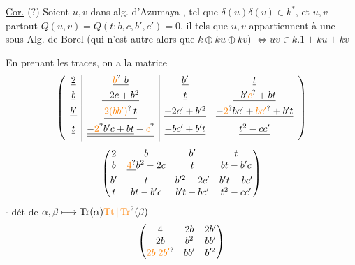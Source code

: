 \uline{Cor.} (?) Soient $u,v$ dans alg. d'Azumaya , tel que $\delta(u)\delta(v)\in k^*$,  et $u,v$ partout   $Q(u,v)=Q(t;b,c,b',c')=0$,  il  tels que $u,v$ appartiennent à une  sous-Alg. de Borel (qui n'est autre alors que $k\oplus ku\oplus kv$) $\Longleftrightarrow uv\in k.1+ku+kv$


En prenant les traces, on a la matrice
\[
\left(\begin{array}{c|c|cc}
\deleted{2}&\deleted{\unsure{b}\ b}&\deleted{b'}&\deleted{t}\\
\deleted{b}&\deleted{-2c+b^2}&\deleted{t}&\deleted{-b'\unsure{c}+bt}\\
\deleted{b'}&\deleted{\unsure{2(bb')}\,t}&\deleted{-2c'+b'^2}&\deleted{-\unsure{2}bc'+\unsure{bc'}+b't}\\
\deleted{t}&\deleted{\underline{-\unsure{2}b'c+bt}+\unsure{c}}&\deleted{-bc'+b't}&\deleted{t^2-cc'}
\end{array}\right)
\]
\[
\begin{pmatrix}
2&b&b'&t\\
b&\deleted{\unsure{4}}b^2-2c&t&bt-b'c\\
b'&t&b'^2-2c'&b't-bc'\\
t&bt-b'c&b't-bc'&t^2-cc'
\end{pmatrix}
\]
$\cdot$ dét de $\alpha,\beta\longmapsto\operatorname{Tr}(\alpha)\unsure{\operatorname{Tt}|\operatorname{Tr}}(\beta)$
\[
\begin{pmatrix}
4&2b&2b'\\2b&b^2&bb'\\\unsure{2b|2b'}&bb'&b'^2
\end{pmatrix}
\]

